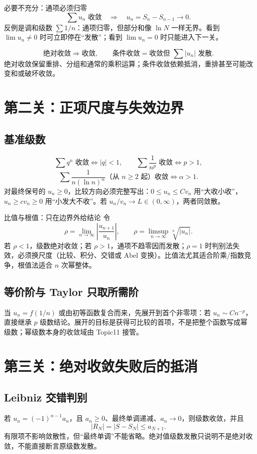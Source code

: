 \documentclass[11pt,a4paper,fontset=fandol]{ctexart}
\begin{document}
\begin{corebox}{必要不充分：通项必须归零}
\[
\sum u_n\text{ 收敛}\quad\Longrightarrow\quad u_n=S_n-S_{n-1}\longrightarrow0.
\]
反例是调和级数 $\sum 1/n$：通项归零，但部分和像 $\ln N$ 一样无界。看到 $\lim u_n\ne0$ 时可立即停在“发散”；看到 $\lim u_n=0$ 时只能进入下一关。
\end{corebox}

\[
\text{绝对收敛}\Rightarrow\text{收敛},\qquad
\text{条件收敛}=\text{收敛但 }\sum|u_n|\text{ 发散}.
\]
绝对收敛保留重排、分组和通常的乘积运算；条件收敛依赖抵消，重排甚至可能改变和或破坏收敛。

\section{第二关：正项尺度与失效边界}
\subsection{基准级数}
\[
\sum q^n\text{ 收敛}\iff |q|<1,\qquad
\sum\frac1{n^p}\text{ 收敛}\iff p>1,
\]
\[
\sum\frac1{n(\ln n)^\alpha}\text{（从 }n\ge2\text{ 起）收敛}\iff\alpha>1.
\]
对最终保号的 $u_n\ge0$，比较方向必须完整写出：$0\le u_n\le Cv_n$ 用“大收小收”，$u_n\ge cv_n\ge0$ 用“小发大不收”。若 $u_n/v_n\to L\in(0,\infty)$，两者同敛散。

\begin{methodbox}{比值与根值：只在边界外给结论}
令
\[
\rho=\lim_{n\to\infty}\left|\frac{u_{n+1}}{u_n}\right|,
\qquad
\rho=\limsup_{n\to\infty}\sqrt[n]{|u_n|}.
\]
若 $\rho<1$，级数绝对收敛；若 $\rho>1$，通项不趋零因而发散；$\rho=1$ 时判别法失效，必须换尺度（比较、积分、交错或 Abel 变换）。比值法尤其适合阶乘/指数竞争，根值法适合 $n$ 次幂整体。
\end{methodbox}

\subsection{等价阶与 Taylor 只取所需阶}
当 $u_n=f(1/n)$ 或由初等函数复合而来，先展开到首个非零项：若 $u_n\sim Cn^{-p}$，直接继承 $p$ 级数结论。展开的目标是获得可比较的首项，不是把整个函数写成幂级数；幂级数本身的收敛域由 Topic11 接管。

\section{第三关：绝对收敛失败后的抵消}
\subsection{Leibniz 交错判别}
若 $u_n=(-1)^{n-1}a_n$，且 $a_n\ge0$、最终单调递减、$a_n\to0$，则级数收敛，并且
\[
|R_N|=|S-S_N|\le a_{N+1}.
\]
有限项不影响敛散性，但“最终单调”不能省略。绝对值级数发散只说明不是绝对收敛，不能直接断言原级数发散。
\end{document}
